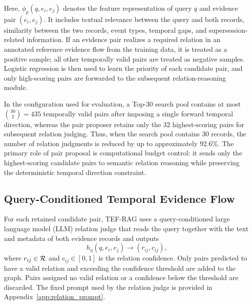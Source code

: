 Here, $\phi_p(q,e_i,e_j)$ denotes the feature representation of query $q$ and evidence pair $(e_i,e_j)$. It includes textual relevance between the query and both records, similarity between the two records, event types, temporal gaps, and supersession-related information. If an evidence pair realizes a required relation in an annotated reference evidence flow from the training data, it is treated as a positive sample; all other temporally valid pairs are treated as negative samples. Logistic regression is then used to learn the priority of each candidate pair, and only high-scoring pairs are forwarded to the subsequent relation-reasoning module.

In the configuration used for evaluation, a Top-30 search pool contains at most $\binom{30}{2}=435$ temporally valid pairs after imposing a single forward temporal direction, whereas the pair proposer retains only the 32 highest-scoring pairs for subsequent relation judging.
Thus, when the search pool contains 30 records, the number of relation judgments is reduced by up to approximately 92.6\%.
The primary role of pair proposal is computational budget control: it sends only the highest-scoring candidate pairs to semantic relation reasoning while preserving the deterministic temporal direction constraint.

\subsection{Query-Conditioned Temporal Evidence Flow}

For each retained candidate pair, TEF-RAG uses a query-conditioned large language model (LLM) relation judge that reads the query together with the text and metadata of both evidence records and outputs
\begin{equation}
h_{\eta}(q,e_i,e_j)
\rightarrow
(r_{ij},c_{ij}),
\end{equation}
where $r_{ij}\in\mathcal{R}$ and $c_{ij}\in[0,1]$ is the relation confidence. Only pairs predicted to have a valid relation and exceeding the confidence threshold are added to the graph. Pairs assigned no valid relation or a confidence below the threshold are discarded. The fixed prompt used by the relation judge is provided in Appendix~\ref{app:relation_prompt}.

